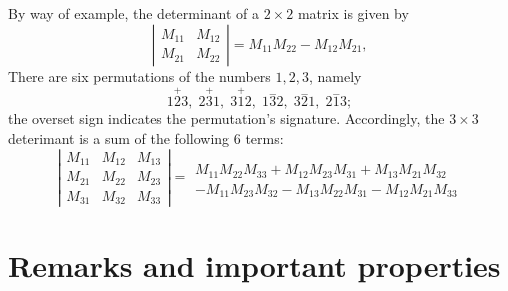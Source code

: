 \documentclass[12pt]{article}
\begin{document}
By way of example, the determinant of a $2\times2$ matrix is given by
$$\left| \begin{matrix} M_{11} & M_{12} \\ M_{21}& M_{22}
\end{matrix}\right| = M_{11} M_{22}-M_{12}M_{21},$$
There are six permutations of the numbers $1,2,3$, namely
$$1\overset{+}23,\;2\overset{+}31,\;3\overset{+}12,\;1\overset{-}32,\;
3\overset{-}21,\;2\overset{-}13;$$
the overset sign indicates the permutation's signature. Accordingly,
the $3\times 3$ deterimant is a sum of the following $6$ terms:
$$ \left| \begin{matrix}
M_{11} & M_{12} & M_{13} \\
M_{21} & M_{22} & M_{23} \\
M_{31} & M_{32} & M_{33}
\end{matrix}\right| =
\begin{array}{rr}
\\
M_{11} M_{22} M_{33} + M_{12} M_{23} M_{31} + M_{13}M_{21} M_{32} \\
-M_{11}M_{23}M_{32}-M_{13}M_{22} M_{31} - M_{12}M_{21}M_{33}
\end{array}
$$

\section*{Remarks and important properties}
\end{document}
